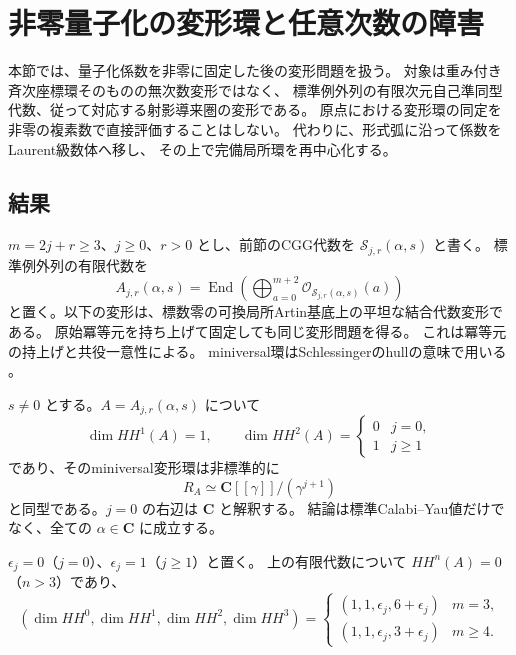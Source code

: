 \section{非零量子化の変形環と任意次数の障害}
\label{sec:fixed-quantum-hulls-v35}

本節では、量子化係数を非零に固定した後の変形問題を扱う。
対象は重み付き斉次座標環そのものの無次数変形ではなく、
標準例外列の有限次元自己準同型代数、従って対応する射影導来圏の変形である。
原点における変形環の同定を非零の複素数で直接評価することはしない。
代わりに、形式弧に沿って係数をLaurent級数体へ移し、
その上で完備局所環を再中心化する。

\subsection{結果}

$m=2j+r\ge3$、$j\ge0$、$r>0$ とし、前節のCGG代数を
$\mathcal S_{j,r}(\alpha,s)$ と書く。
標準例外列の有限代数を
\[
 A_{j,r}(\alpha,s)=
 \operatorname{End}\left(\bigoplus_{a=0}^{m+2}
              \mathcal O_{\mathcal S_{j,r}(\alpha,s)}(a)\right)
\]
と置く。以下の変形は、標数零の可換局所Artin基底上の平坦な結合代数変形である。
原始冪等元を持ち上げて固定しても同じ変形問題を得る。
これは冪等元の持上げと共役一意性による。
miniversal環はSchlessingerのhullの意味で用いる
\cite{Schlessinger1968}。

\begin{theorem}[固定非零量子化のminiversal環]
\label{thm:fixed-quantum-hull-v35}
$s\ne0$ とする。$A=A_{j,r}(\alpha,s)$ について
\[
 \dim HH^1(A)=1,\qquad
 \dim HH^2(A)=
 \begin{cases}0&j=0,\\1&j\ge1\end{cases}
\]
であり、そのminiversal変形環は非標準的に
\[
 \boxed{R_A\simeq\mathbf C[[\gamma]]/(\gamma^{j+1})}
\]
と同型である。$j=0$ の右辺は $\mathbf C$ と解釈する。
結論は標準Calabi--Yau値だけでなく、全ての $\alpha\in\mathbf C$ に成立する。
\end{theorem}

\begin{corollary}[Hochschild群の次元]
\label{cor:fixed-quantum-HH-v35}
$\epsilon_j=0$（$j=0$）、$\epsilon_j=1$（$j\ge1$）と置く。
上の有限代数について $HH^n(A)=0$（$n>3$）であり、
\[
 (\dim HH^0,\dim HH^1,\dim HH^2,\dim HH^3)=
 \begin{cases}
 (1,1,\epsilon_j,6+\epsilon_j)&m=3,\\
 (1,1,\epsilon_j,3+\epsilon_j)&m\ge4.
 \end{cases}
\]
\end{corollary}

